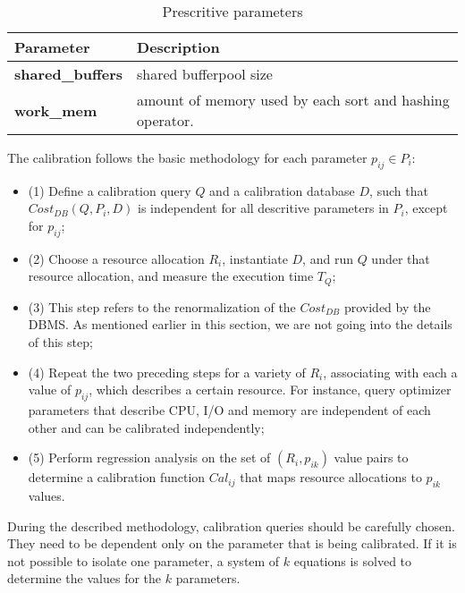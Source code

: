 \begin{table}[ht]
    \centering
    \begin{tabular}{ | l | p{5cm} |}
    \hline
      Parameter & Description  \\ \hline
    \textbf{shared\_buffers} & shared bufferpool size \\ \hline
    \textbf{work\_mem} & amount of memory used by each sort and hashing operator. \\
    \hline
    \end{tabular}
    \caption{Prescritive parameters}
    \label{table:prescritive}
\end{table}

The calibration follows the basic methodology for each parameter $p_{ij} \in P_{i}$:

\begin{itemize}
 \item (1) Define a calibration query $Q$ and a calibration database $D$, such that $Cost_{DB}(Q,P_{i},D)$ is independent for all descritive parameters in $P_{i}$, except for $p_{ij}$; \\
  \item (2) Choose a resource allocation $R_{i}$, instantiate $D$, and run $Q$ under that resource allocation, and measure the execution time $T_{Q}$; \\
  \item (3) This step refers to the renormalization of the $Cost_{DB}$ provided by the DBMS. As mentioned earlier in this section, we are not going into the details of this step; \\
  \item (4) Repeat the two preceding steps for a variety of $R_{i}$, associating with each  a value of $p_{ij}$, which describes a certain resource. For instance, query optimizer parameters that describe CPU, I/O and memory are independent of each other and can be calibrated independently; \\
  \item (5) Perform regression analysis on the set of $(R_{i},p_{ik})$ value pairs to determine a calibration function $Cal_{ij}$ that maps resource allocations to $p_{ik}$ values. \\
\end{itemize}

During the described methodology, calibration queries should be carefully chosen. They need to be dependent only on the parameter that is being calibrated. If it is not possible to isolate one parameter, a system of $k$ equations is solved to determine the values for the $k$ parameters.


